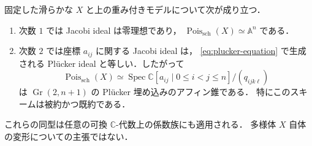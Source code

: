 \begin{theorem}
\label{thm:jacobi-scheme}
固定した滑らかな $X$ と上の重み付きモデルについて次が成り立つ．
\begin{enumerate}
 \item 次数 $1$ では Jacobi ideal は零理想であり，
 $\operatorname{Pois}_{\mathrm{sch}}(X)\simeq\mathbb A^n$ である．
 \item 次数 $2$ では座標 $a_{ij}$ に関する Jacobi ideal は，
 \eqref{eq:plucker-equation} で生成される Pl\"ucker ideal と等しい．したがって
 \[
 \operatorname{Pois}_{\mathrm{sch}}(X)
 \simeq\operatorname{Spec}
 \mathbb C[a_{ij}\mid0\leq i<j\leq n]/(q_{ijk\ell})
 \]
 は $\operatorname{Gr}(2,n+1)$ の Pl\"ucker 埋め込みのアフィン錐である．
 特にこのスキームは被約かつ既約である．
\end{enumerate}
これらの同型は任意の可換 $\mathbb C$-代数上の係数族にも適用される．
多様体 $X$ 自体の変形についての主張ではない．
\end{theorem}

